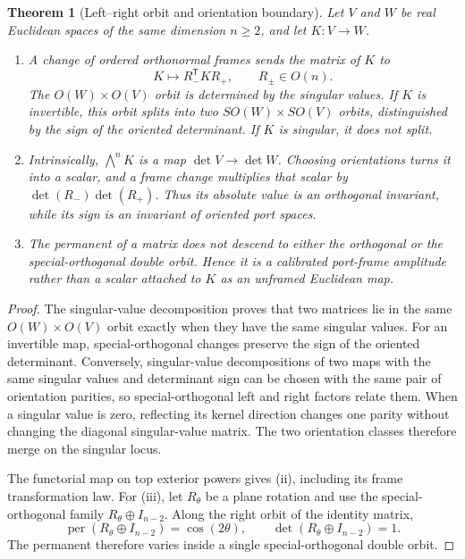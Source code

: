 \documentclass[11pt]{article}
\newtheorem{theorem}{Theorem}[section]
\theoremstyle{remark}
\newcommand{\per}{\operatorname{per}}
\begin{document}
\begin{theorem}[Left--right orbit and orientation boundary]
\label{thm:orbit-boundary}
Let \(V\) and \(W\) be real Euclidean spaces of the same dimension
\(n\geq2\), and let \(K:V\to W\).
\begin{enumerate}[label=\textup{(\roman*)},leftmargin=*]
\item A change of ordered orthonormal frames sends the matrix of \(K\) to
\[
 K\longmapsto R_-^{\mathsf T}KR_+,
 \qquad R_\pm\in O(n).
\]
The \(O(W)\times O(V)\) orbit is determined by the singular values.  If
\(K\) is invertible, this orbit splits into two
\(SO(W)\times SO(V)\) orbits, distinguished by the sign of the oriented
determinant.  If \(K\) is singular, it does not split.
\item Intrinsically, \(\bigwedge^nK\) is a map
\(\det V\to\det W\).  Choosing orientations turns it into a scalar, and a
frame change multiplies that scalar by
\(\det(R_-)\det(R_+)\).  Thus its absolute value is an orthogonal invariant,
while its sign is an invariant of oriented port spaces.
\item The permanent of a matrix does not descend to either the orthogonal or
the special-orthogonal double orbit.  Hence it is a calibrated port-frame
amplitude rather than a scalar attached to \(K\) as an unframed Euclidean
map.
\end{enumerate}
\end{theorem}

\begin{proof}
The singular-value decomposition proves that two matrices lie in the same
\(O(W)\times O(V)\) orbit exactly when they have the same singular values.
For an invertible map, special-orthogonal changes preserve the sign of the
oriented determinant.  Conversely, singular-value decompositions of two maps
with the same singular values and determinant sign can be chosen with the
same pair of orientation parities, so special-orthogonal left and right
factors relate them.  When a singular value is zero, reflecting its kernel
direction changes one parity without changing the diagonal singular-value
matrix.  The two orientation classes therefore merge on the singular locus.

The functorial map on top exterior powers gives (ii), including its frame
transformation law.  For (iii), let \(R_\theta\) be a plane rotation and use
the special-orthogonal family
\(R_\theta\oplus I_{n-2}\).  Along the right orbit of the identity matrix,
\[
 \per(R_\theta\oplus I_{n-2})=\cos(2\theta),
 \qquad
 \det(R_\theta\oplus I_{n-2})=1.
\]
The permanent therefore varies inside a single special-orthogonal double
orbit.
\end{proof}
\end{document}
